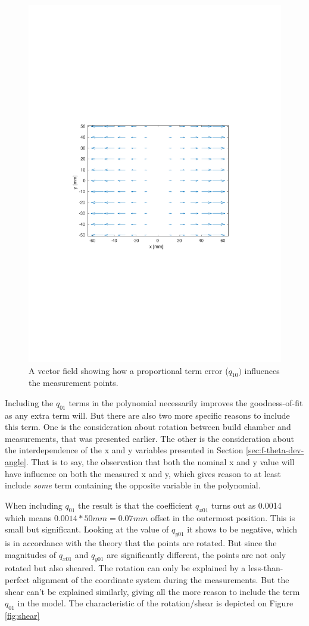 \begin{figure}[ht!]
  \centering
  \includegraphics[clip, trim=3.5cm 8cm 3.5cm 8cm, width=0.72\linewidth]{Pictures/proportional.pdf}
  \caption{A vector field showing how a proportional term error ($q_{10})$ influences the measurement points.}
  \label{fig:proportional}
\end{figure}

Including the $q_{01}$ terms in the polynomial necessarily improves the goodness-of-fit as any extra term will. But there are also two more specific reasons to include this term. One is the consideration about rotation between build chamber and measurements, that was presented earlier. The other is the consideration about the interdependence of the x and y variables presented in Section \ref{sec:f-theta-dev-angle}. That is to say, the observation that both the nominal x and y value will have influence on both the measured x and y, which gives reason to at least include \textit{some} term containing the opposite variable in the polynomial.

When including $q_{01}$ the result is that the coefficient $q_{x01}$ turns out as 0.0014 which means $0.0014*50mm = 0.07mm$ offset in the outermost position. This is small but significant. Looking at the value of $q_{y01}$ it shows to be negative, which is in accordance with the theory that the points are rotated. But since the magnitudes of $q_{x01}$ and $q_{y01}$ are significantly different, the points are not only rotated but also sheared. The rotation can only be explained by a less-than-perfect alignment of the coordinate system during the measurements. But the shear can't be explained similarly, giving all the more reason to include the term $q_{01}$ in the model. The characteristic of the rotation/shear is depicted on Figure \ref{fig:shear}

